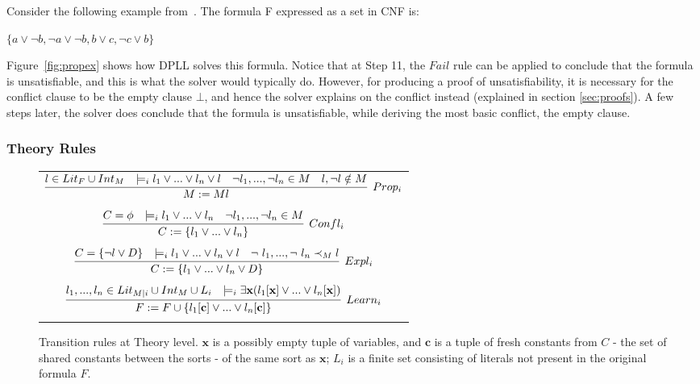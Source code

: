 \documentclass{article}
\begin{document}
Consider the following example from~\cite{DBLP:conf/fmcad/KatzBTRH16}.
The formula F expressed as a set in CNF is:
\begin{center}
$\{a \lor \neg b, \neg a \lor \neg b, b \lor c, \neg c \lor b\}$
\end{center}
Figure~\ref{fig:propex} shows how DPLL solves this 
formula. Notice that at Step 11, the $Fail$ rule can be 
applied to conclude that the formula is unsatisfiable, and 
this is what the solver would typically do. However, for 
producing a proof of unsatisfiability, it is necessary for the 
conflict clause to be the empty clause $\bot$, and hence the 
solver explains on the conflict instead (explained in 
section \ref{sec:proofs}). A few steps later, 
the solver does conclude that the formula is unsatisfiable, 
while deriving the most basic conflict, the empty clause.


\subsubsection{Theory Rules}
		\label{sec:theoryrules}

\begin{figure}[t]
	\centering
	\begin{framed}
		\begin{tabular}{c}
			
			$\infer[Prop_i]{M := Ml}	{l \in Lit_F \cup Int_M & 
				\models_i l_1 \lor ... \lor 
				l_n \lor l & \neg l_1, ..., \neg l_n \in M & l,\neg l \notin M}$ \\ \\
			$\infer[Confl_i]{C := \{l_1 \lor ... \lor l_n \}}
			{C = \phi & \models_i l_1 \lor ... \lor l_n & 
				\neg l_1, ..., \neg l_n \in M}$ \\ \\
			$\infer[Expl_i]{C := \{l_1 \lor ... \lor l_n \lor D\}}
			{C = \{\neg l \lor D\} & \models_i l_1 \lor ... \lor l_n \lor l & 
				\neg\ l_1, ..., \neg\ l_n \prec_M l}$ \\ \\
			$\infer[Learn_i]{F := F \cup \{l_1[\textbf{c}] 
				\lor ... \lor l_n[\textbf{c}]\}}
			{l_1,...,l_n \in Lit_{M|i} \cup Int_M \cup L_i & 
				\models_i \exists \textbf{x}(l_1[\textbf{x}] \lor ... 
				\lor l_n[\textbf{x}])}$ \\ \\
		\end{tabular}
	\end{framed}
	\caption{Transition rules at Theory level. $\textbf{x}$ is a possibly empty 
		tuple of variables, and $\textbf{c}$ is a tuple of fresh constants 
		from $C$ - the set of shared constants between the sorts - of the
		same sort as $\textbf{x}$; $L_i$ is a finite set consisting of literals
		not present in the original formula $F$.}
	\label{fig:theoryrules}
\end{figure}
\end{document}
